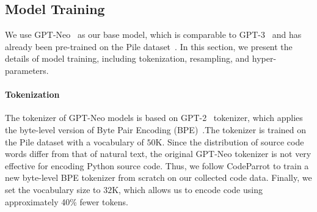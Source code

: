 \documentclass{article}
\begin{document}
\begin{table}[t]
	\centering
	\caption{Hyper-parameters in pre-training.}
	\label{Table:TrainingHyperParameters}
\end{table}

\subsection{Model Training}
We use GPT-Neo~\cite{gpt-neo} as our base model, which is comparable to GPT-3~\cite{brown2020language} and has already been pre-trained on the Pile dataset~\cite{gao2020pile}. 
In this section, we present the details of model training, including tokenization, resampling, and hyper-parameters.

\paragraph{Tokenization}
The tokenizer of GPT-Neo models is based on GPT-2~\cite{radford2019language} tokenizer, which applies the byte-level version of Byte Pair Encoding (BPE)~\cite{sennrich2016neural}.The tokenizer is trained on the Pile dataset with a vocabulary of $50$K. 
Since the distribution of source code words differ from that of natural text, the original GPT-Neo tokenizer is not very effective for encoding Python source code. 
Thus, we follow CodeParrot to train a new byte-level BPE tokenizer from scratch on our collected code data. 
Finally, we set the vocabulary size to $32$K, which allows us to encode code using approximately 40\% fewer tokens. 
\end{document}
